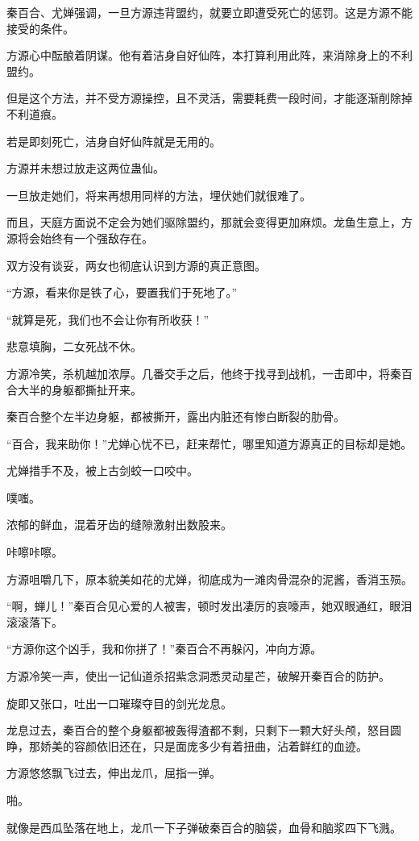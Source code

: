 \begin{this_body}
秦百合、尤婵强调，一旦方源违背盟约，就要立即遭受死亡的惩罚。这是方源不能接受的条件。

方源心中酝酿着阴谋。他有着洁身自好仙阵，本打算利用此阵，来消除身上的不利盟约。

但是这个方法，并不受方源操控，且不灵活，需要耗费一段时间，才能逐渐削除掉不利道痕。

若是即刻死亡，洁身自好仙阵就是无用的。

方源并未想过放走这两位蛊仙。

一旦放走她们，将来再想用同样的方法，埋伏她们就很难了。

而且，天庭方面说不定会为她们驱除盟约，那就会变得更加麻烦。龙鱼生意上，方源将会始终有一个强敌存在。

双方没有谈妥，两女也彻底认识到方源的真正意图。

“方源，看来你是铁了心，要置我们于死地了。”

“就算是死，我们也不会让你有所收获！”

悲意填胸，二女死战不休。

方源冷笑，杀机越加浓厚。几番交手之后，他终于找寻到战机，一击即中，将秦百合大半的身躯都撕扯开来。

秦百合整个左半边身躯，都被撕开，露出内脏还有惨白断裂的肋骨。

“百合，我来助你！”尤婵心忧不已，赶来帮忙，哪里知道方源真正的目标却是她。

尤婵措手不及，被上古剑蛟一口咬中。

噗嗤。

浓郁的鲜血，混着牙齿的缝隙激射出数股来。

咔嚓咔嚓。

方源咀嚼几下，原本貌美如花的尤婵，彻底成为一滩肉骨混杂的泥酱，香消玉殒。

“啊，蝉儿！”秦百合见心爱的人被害，顿时发出凄厉的哀嚎声，她双眼通红，眼泪滚滚落下。

“方源你这个凶手，我和你拼了！”秦百合不再躲闪，冲向方源。

方源冷笑一声，使出一记仙道杀招紫念洞悉灵动星芒，破解开秦百合的防护。

旋即又张口，吐出一口璀璨夺目的剑光龙息。

龙息过去，秦百合的整个身躯都被轰得渣都不剩，只剩下一颗大好头颅，怒目圆睁，那娇美的容颜依旧还在，只是面庞多少有着扭曲，沾着鲜红的血迹。

方源悠悠飘飞过去，伸出龙爪，屈指一弹。

啪。

就像是西瓜坠落在地上，龙爪一下子弹破秦百合的脑袋，血骨和脑浆四下飞溅。

\end{this_body}

